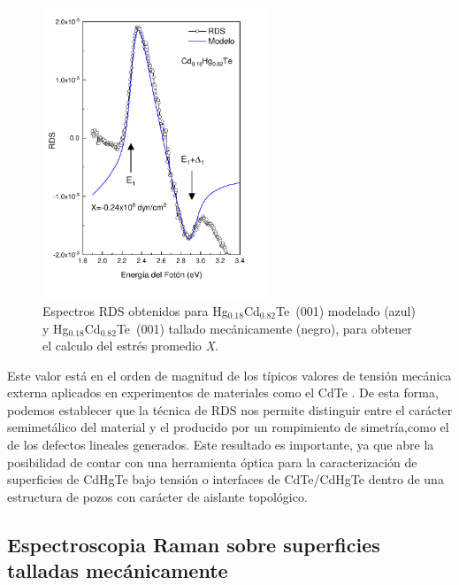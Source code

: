 \begin{figure}[H]
    \centering
    \includegraphics[width=0.6\textwidth]{figures/chap4/hgcdte-strained/rds-results/hgcdte_rds_stress.pdf}
        \caption{Espectros RDS obtenidos para \mbox{Hg$_{0.18}$Cd$_{0.82}$Te (001)} modelado (azul) y \mbox{Hg$_{0.18}$Cd$_{0.82}$Te (001)} tallado mecánicamente (negro), para obtener el calculo del estrés promedio \textit{X}.}
    \label{fig:hgcdte_rds_stress}
\end{figure}

Este valor está en el orden de magnitud de los típicos valores de tensión mecánica externa aplicados en experimentos de materiales como el CdTe \cite{LastrasMartnez2010}. De esta forma, podemos establecer que la técnica de RDS nos permite distinguir entre el carácter semimetálico del material y el producido por un rompimiento de simetría,como el de los defectos lineales generados. Este resultado es importante, ya que abre la posibilidad de contar con una herramienta óptica para la caracterización de superficies de CdHgTe bajo tensión o interfaces de CdTe/CdHgTe dentro de una estructura de pozos con carácter de aislante topológico.

\subsection{Espectroscopia Raman sobre superficies talladas mecánicamente}
\label{sec:chap4-hgcdte-raman}

